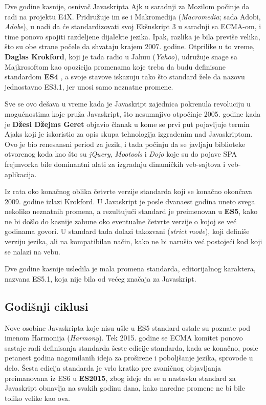 Dve godine kasnije, osnivač Javaskripta Ajk u saradnji za Mozilom počinje da radi na projektu E4X.
Pridružuje im se i Makromedija (\textsl{Macromedia}; sada Adobi, \textsl{Adobe}), u nadi da će standardizovati svoj Ekšnskript 3 u saradnji sa ECMA-om, i time ponovo spojiti razdeljene dijalekte jezika.
Ipak, razlika je bila previše velika, što su obe strane počele da shvataju krajem 2007. godine.
Otprilike u to vreme, \textbf{Daglas Krokford}, koji je tada radio u Jahuu (\textsl{Yahoo}), udružuje snage sa Majkrosoftom kao opozicija promenama koje treba da budu definisane standardom \textbf{ES4} \cite{axel-rauschmayer:speaking}, a svoje stavove iskazuju tako što standard žele da nazovu jednostavno ES3.1, jer unosi samo neznatne promene.

Sve se ovo dešava u vreme kada je Javaskript zajednica pokrenula revoluciju u mogućnostima koje pruža Javaskript, što nesumnjivo otpočinje 2005. godine kada je \textbf{Džesi Džejms Geret} objavio članak u kome se prvi put pojavljuje termin Ajaks koji je iskoristio za opis skupa tehnologija izgradenim nad Javaskriptom.
Ovo je bio renesansni period za jezik, i tada počinju da se javljaju biblioteke otvorenog koda kao što su \textsl{jQuery}, \textsl{Mootools} i \textsl{Dojo} koje su do pojave SPA frejmvorka bile dominantni alati za izgradnju dinamičkih veb-sajtova i veb-aplikacija.

Iz rata oko konačnog oblika četvrte verzije standarda koji se konačno okončava 2009. godine izlazi Krokford.
U Javaskript je posle dvanaest godina uneto svega nekoliko neznatnih promena, a rezultujući standard je preimenovan u \textbf{ES5}, kako ne bi došlo do kasnije zabune oko eventualne četvrte verzije o kojoj se već godinama govori.
U standard tada dolazi takozvani  (\textsl{strict mode}), koji definiše  verziju jezika, ali na kompatibilan način, kako ne bi narušio već postojeći kod koji se nalazi na vebu.

Dve godine kasnije usledila je mala promena standarda, editorijalnog karaktera, nazvana ES5.1, koja nije bila od većeg značaja za Javaskript.

\subsection{Godišnji ciklusi}

Nove osobine Javaskripta koje nisu ušle u ES5 standard ostale su poznate pod imenom Harmonija (\textsl{Harmony}).
Tek 2015. godine se ECMA komitet ponovo sastaje radi definisanja standarda šeste edicije standarda, kada se konačno, posle petanest godina nagomilanih ideja za proširene i poboljšanje jezika, sprovode u delo.
Šesta edicija standarda je vrlo kratko pre zvaničnog objavljanja preimanovana iz ES6 u \textbf{ES2015}, zbog ideje da se u nastavku standard za Javaskript obnavlja na svakih godinu dana, kako naredne promene ne bi bile toliko velike kao ova.


